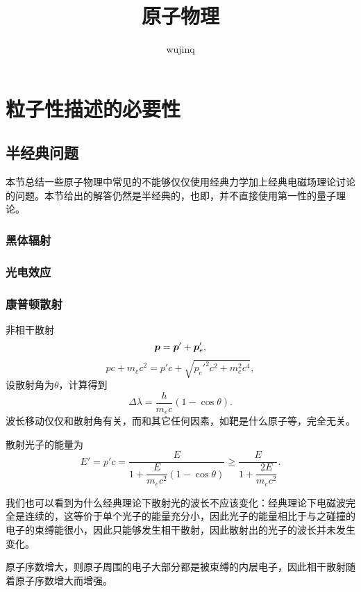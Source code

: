 \documentclass[UTF8, a4paper]{ctexart}
\title{原子物理}
\author{wujinq}
\begin{document}
\maketitle


\section{粒子性描述的必要性}

\subsection{半经典问题}

本节总结一些原子物理中常见的不能够仅仅使用经典力学加上经典电磁场理论讨论的问题。本节给出的解答仍然是半经典的，也即，并不直接使用第一性的量子理论。

\subsubsection{黑体辐射}

\subsubsection{光电效应}

\subsubsection{康普顿散射}

非相干散射
\[
    \vb*{p} = \vb*{p}' + \vb*{p}'_e,
\]
\[
    pc + m_e c^2 = p' c + \sqrt{{p_e'}^2 c^2 + m_e^2 c^4},
\]
设散射角为$\theta$，计算得到
\begin{equation}
    \Delta \lambda = \frac{h}{m_e c} (1 - \cos \theta).
\end{equation}
波长移动仅仅和散射角有关，而和其它任何因素，如靶是什么原子等，完全无关。

散射光子的能量为
\begin{equation}
    E' = p'c = \frac{E}{1 + \dfrac{E}{m_e c^2}(1 - \cos \theta)} \geq \frac{E}{1 + \dfrac{2 E}{m_e c^2}}.
\end{equation}

我们也可以看到为什么经典理论下散射光的波长不应该变化：经典理论下电磁波完全是连续的，这等价于单个光子的能量充分小，因此光子的能量相比于与之碰撞的电子的束缚能很小，因此只能够发生相干散射，因此散射出的光子的波长并未发生变化。

原子序数增大，则原子周围的电子大部分都是被束缚的内层电子，因此相干散射随着原子序数增大而增强。
\end{document}
